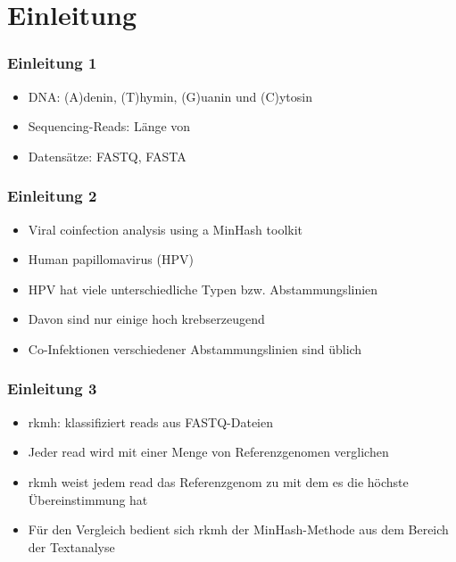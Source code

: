 \section{Einleitung}

\begin{frame}
    \frametitle{Einleitung 1}

    

    \begin{itemize}
        \item DNA: (A)denin, (T)hymin, (G)uanin und (C)ytosin
        \item Sequencing-Reads: Länge von 
        \item Datensätze: FASTQ, FASTA
    \end{itemize}

    
\end{frame}


\begin{frame}
    \frametitle{Einleitung 2}

    \begin{itemize}
        \item Viral coinfection analysis using a MinHash toolkit
        \item Human papillomavirus (HPV)
        \item HPV hat viele unterschiedliche Typen bzw. Abstammungslinien
        \item Davon sind nur einige hoch krebserzeugend
        \item Co-Infektionen verschiedener Abstammungslinien sind üblich
    \end{itemize}
\end{frame}

\begin{frame}
    \frametitle{Einleitung 3}

    
    \begin{itemize}
        \item rkmh: klassifiziert reads aus FASTQ-Dateien
        \item Jeder read wird mit einer Menge von Referenzgenomen verglichen
        \item rkmh weist jedem read das Referenzgenom zu mit dem es die höchste Übereinstimmung hat
        \item Für den Vergleich bedient sich rkmh der MinHash-Methode aus dem Bereich der Textanalyse
    \end{itemize}
\end{frame}

